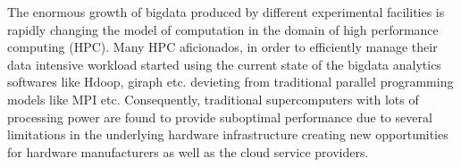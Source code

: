 
The enormous growth of bigdata produced by different experimental facilities is rapidly changing the model of computation in the domain of high performance computing (HPC).
Many HPC aficionados, in order to efficiently manage their data intensive workload started using the current state of the bigdata analytics softwares like Hdoop, giraph etc. devieting from traditional parallel programming models like MPI etc.
Consequently, traditional supercomputers with lots of processing power are found to provide suboptimal performance due to several limitations in the underlying hardware infrastructure creating new opportunities for hardware manufacturers as well as the cloud service providers.

